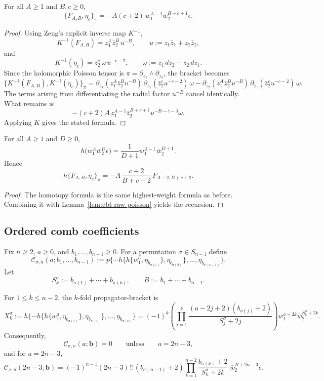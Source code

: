 \begin{lemma}
For all $A\ge1$ and $B,c\ge0$,
\[
\{F_{A,B},\eta_c\}_\pi
=
-A(c+2)\,w_1^{A-1}\bar w_2^{B+c+1}\epsilon.
\]
\end{lemma}

\begin{proof}
Using Zeng's explicit inverse map $K^{-1}$,
\[
K^{-1}(F_{A,B})=z_1^A\bar z_2^B\,u^{-B},
\qquad
u:=z_1\bar z_1+z_2\bar z_2,
\]
and
\[
K^{-1}(\eta_c)=\bar z_2^c\,\omega\,u^{-c-2},
\qquad
\omega:=\bar z_1\,d\bar z_2-\bar z_2\,d\bar z_1.
\]
Since the holomorphic Poisson tensor is $\pi=\partial_{z_1}\wedge \partial_{z_2}$, the bracket becomes
\[
\{K^{-1}(F_{A,B}),K^{-1}(\eta_c)\}_\pi
=
\partial_{z_1}(z_1^A\bar z_2^Bu^{-B})\,\partial_{z_2}(\bar z_2^cu^{-c-2})\,\omega
-
\partial_{z_2}(z_1^A\bar z_2^Bu^{-B})\,\partial_{z_1}(\bar z_2^cu^{-c-2})\,\omega.
\]
The terms arising from differentiating the radial factor $u^{-B}$ cancel identically. What remains is
\[
-(c+2)A\,z_1^{A-1}\bar z_2^{B+c+1}u^{-B-c-3}\omega.
\]
Applying $K$ gives the stated formula.
\end{proof}

\begin{lemma}
For all $A\ge1$ and $D\ge0$,
\[
h\bigl(w_1^A\bar w_2^D\epsilon\bigr)=\frac{1}{D+1}w_1^{A-1}\bar w_2^{D+1}.
\]
Hence
\[
h\{F_{A,B},\eta_c\}_\pi
=
-A\,\frac{c+2}{B+c+2}\,F_{A-2,B+c+2}.
\]
\end{lemma}

\begin{proof}
The homotopy formula is the same highest-weight formula as before. Combining it with Lemma~\ref{lem:cbt-raw-poisson} yields the recursion.
\end{proof}

\subsection{Ordered comb coefficients}

Fix $n\ge2$, $a\ge0$, and $b_1,\dots,b_{n-1}\ge0$. For a permutation $\sigma\in S_{n-1}$ define
\[
\mathcal C_{\sigma,n}(a;b_1,\dots,b_{n-1})
:=
p\{\cdots h\{h\{w_1^a,\eta_{b_{\sigma(1)}}\},\eta_{b_{\sigma(2)}}\},\dots,\eta_{b_{\sigma(n-1)}}\}.
\]
Let
\[
S_k^\sigma:=b_{\sigma(1)}+\cdots+b_{\sigma(k)},
\qquad
B:=b_1+\cdots+b_{n-1}.
\]

\begin{proposition}
For $1\le k\le n-2$, the $k$-fold propagator-bracket is
\[
X_k^\sigma:=
h\{\cdots h\{h\{w_1^a,\eta_{b_{\sigma(1)}}\},\eta_{b_{\sigma(2)}}\},\dots,\eta_{b_{\sigma(k)}}\}
=
(-1)^k\left(\prod_{j=1}^k
\frac{(a-2j+2)(b_{\sigma(j)}+2)}{S_j^\sigma+2j}
\right)
w_1^{a-2k}\bar w_2^{S_k^\sigma+2k}.
\]
Consequently,
\[
\mathcal C_{\sigma,n}(a;\mathbf b)=0
\qquad\text{unless}\qquad
a=2n-3,
\]
and for $a=2n-3$,
\[
\mathcal C_{\sigma,n}(2n-3;\mathbf b)
=
(-1)^{n-1}(2n-3)!!\,
(b_{\sigma(n-1)}+2)
\prod_{k=1}^{n-2}
\frac{b_{\sigma(k)}+2}{S_k^\sigma+2k}\;
\bar w_2^{B+2n-3}\epsilon.
\]
\end{proposition}

